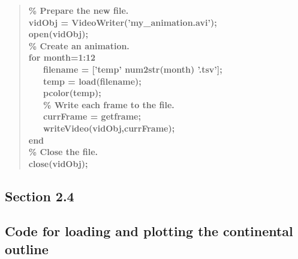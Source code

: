 \documentclass{tufte-book} %
\newenvironment{docspecbold}{\begin{quotation}\ttfamily\bfseries\parskip0pt\parindent0pt\ignorespaces}{\end{quotation}}
\begin{document}
\begin{docspecbold}
\textcolor[rgb]{0,0.501961,0}{\% Prepare the new file.}\\
vidObj = VideoWriter(\textcolor[rgb]{1,0,1}{'my\_animation.avi'});\\
open(vidObj);\\
\textcolor[rgb]{0,0.501961,0}{\% Create an animation.}\\
for month=1:12\\
\ \ \ filename = [\textcolor[rgb]{1,0,1}{'temp'} num2str(month) \textcolor[rgb]{1,0,1}{'.tsv'}];\\
\ \ \ temp = load(filename);\\
\ \ \ pcolor(temp);\\
\ \ \ \textcolor[rgb]{0,0.501961,0}{\% Write each frame to the file.}\\
\ \ \ currFrame = getframe;\\
\ \ \ writeVideo(vidObj,currFrame);\\
end\\
\textcolor[rgb]{0,0.501961,0}{\% Close the file.}\\
close(vidObj);  
\end{docspecbold}

%
\newpage

\subsection*{\textbf{Section 2.4}}

\subsection*{Code for loading and plotting the continental outline}
\end{document}
